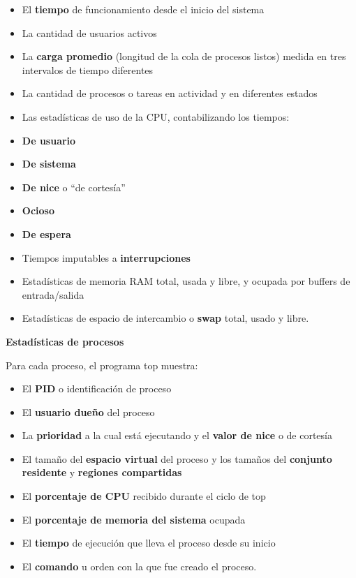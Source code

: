 \documentclass[spanish,A4,]{article}
\begin{document}
\begin{itemize}
\itemsep1pt\parskip0pt
\item
  El \textbf{tiempo} de funcionamiento desde el inicio del sistema
\item
  La cantidad de usuarios activos
\item
  La \textbf{carga promedio} (longitud de la cola de procesos listos)
  medida en tres intervalos de tiempo diferentes
\item
  La cantidad de procesos o tareas en actividad y en diferentes estados
\item
  Las estadísticas de uso de la CPU, contabilizando los tiempos:
\item
  \textbf{De usuario}
\item
  \textbf{De sistema}
\item
  \textbf{De nice} o ``de cortesía''
\item
  \textbf{Ocioso}
\item
  \textbf{De espera}
\item
  Tiempos imputables a \textbf{interrupciones}
\item
  Estadísticas de memoria RAM total, usada y libre, y ocupada por
  buffers de entrada/salida
\item
  Estadísticas de espacio de intercambio o \textbf{swap} total, usado y
  libre.
\end{itemize}

\textbf{Estadísticas de procesos}

Para cada proceso, el programa top muestra:

\begin{itemize}
\itemsep1pt\parskip0pt
\item
  El \textbf{PID} o identificación de proceso
\item
  El \textbf{usuario dueño} del proceso
\item
  La \textbf{prioridad} a la cual está ejecutando y el \textbf{valor de
  nice} o de cortesía
\item
  El tamaño del \textbf{espacio virtual} del proceso y los tamaños del
  \textbf{conjunto residente} y \textbf{regiones compartidas}
\item
  El \textbf{porcentaje de CPU} recibido durante el ciclo de top
\item
  El \textbf{porcentaje de memoria del sistema} ocupada
\item
  El \textbf{tiempo} de ejecución que lleva el proceso desde su inicio
\item
  El \textbf{comando} u orden con la que fue creado el proceso.
\end{itemize}
\end{document}
